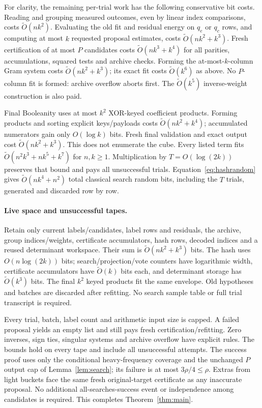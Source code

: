 \documentclass[11pt]{article}
\theoremstyle{remark}\newtheorem{remark}[theorem]{Remark}
\begin{document}
For clarity, the remaining per-trial work has the following conservative bit costs. Reading and grouping measured outcomes, even by linear index comparisons, costs $\widetilde O(nk^2)$. Evaluating the old fit and residual energy on $q_e$ or $q_c$ rows, and computing at most $k$ requested proposal estimates, costs $\widetilde O(nk^2+k^3)$. Fresh certification of at most $P$ candidates costs $\widetilde O(nk^3+k^4)$ for all parities, accumulations, squared tests and archive checks. Forming the at-most-$k$-column Gram system costs $\widetilde O(nk^2+k^3)$; its exact fit costs $\widetilde O(k^6)$ as above. No $P$-column fit is formed: archive overflow aborts first. The $\widetilde O(k^5)$ inverse-weight construction is also paid.

Final Booleanity uses at most $k^2$ XOR-keyed coefficient products. Forming products and sorting explicit keys/payloads costs $\widetilde O(nk^2+k^4)$; accumulated numerators gain only $O(\log k)$ bits. Fresh final validation and exact output cost $\widetilde O(nk^2+k^3)$. This does not enumerate the cube. Every listed term fits $\widetilde O(n^2k^3+nk^5+k^7)$ for $n,k\ge1$. Multiplication by $T=O(\log(2k))$ preserves that bound and pays all unsuccessful trials. Equation~\eqref{eq:hashrandom} gives $\widetilde O(nk^4+n^2)$ total classical search random bits, including the $T$ trials, generated and discarded row by row.

\paragraph{Live space and unsuccessful tapes.}
Retain only current labels/candidates, label rows and residuals, the archive, group indices/weights, certificate accumulators, hash rows, decoded indices and a reused determinant workspace. Their sum is $\widetilde O(nk^2+k^3)$ bits. The hash uses $O(n\log(2k))$ bits; search/projection/vote counters have logarithmic width, certificate accumulators have $\widetilde O(k)$ bits each, and determinant storage has $\widetilde O(k^3)$ bits. The final $k^2$ keyed products fit the same envelope. Old hypotheses and batches are discarded after refitting. No search sample table or full trial transcript is required.

Every trial, batch, label count and arithmetic input size is capped. A failed proposal yields an empty list and still pays fresh certification/refitting. Zero inverses, sign ties, singular systems and archive overflow have explicit rules. The bounds hold on every tape and include all unsuccessful attempts. The success proof uses only the conditional heavy-frequency coverage and the unchanged $P$ output cap of Lemma~\ref{lem:search}; its failure is at most $3\rho/4\le\rho$. Extras from light buckets face the same fresh original-target certificate as any inaccurate proposal. No additional all-searches-success event or independence among candidates is required. This completes Theorem~\ref{thm:main}.
\end{document}

